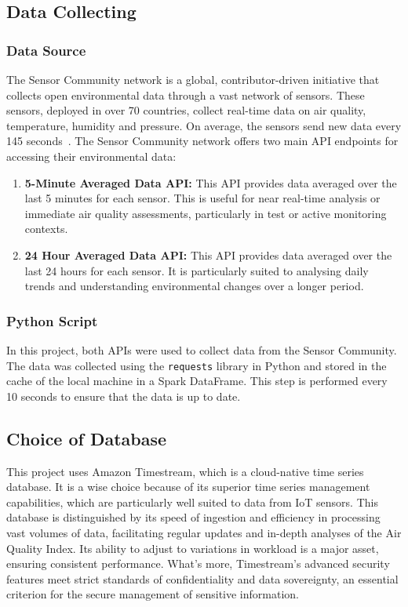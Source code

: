 \documentclass[12pt,oneside]{book} %
\begin{document}
\subsection{Data Collecting}
\subsubsection{Data Source}
The Sensor Community network is a global, contributor-driven initiative that
collects open environmental data through a vast network of sensors. These
sensors, deployed in over 70 countries, collect real-time data on air quality,
temperature, humidity and pressure. On average, the sensors send new data every
145 seconds~\cite{sensorcommunity2023synchronization}. The Sensor Community
network offers two main API endpoints for accessing their environmental data:

\begin{enumerate}
    \item \textbf{5-Minute Averaged Data API:} This API provides data averaged over the last 5 minutes for each sensor. This is useful for near real-time analysis or immediate air quality assessments, particularly in test or active monitoring contexts.
    \item \textbf{24 Hour Averaged Data API:} This API provides data averaged over the last 24 hours for each sensor. It is particularly suited to analysing daily trends and understanding environmental changes over a longer period.
\end{enumerate}

\subsubsection{Python Script}
In this project, both APIs were used to collect data from the Sensor Community.
The data was collected using the \texttt{requests} library in Python and stored
in the cache of the local machine in a Spark DataFrame. This step is performed
every 10 seconds to ensure that the data is up to date.

\subsection{Choice of Database}
This project uses Amazon Timestream, which is a cloud-native time series
database. It is a wise choice because of its superior time series management
capabilities, which are particularly well suited to data from IoT sensors. This
database is distinguished by its speed of ingestion and efficiency in
processing vast volumes of data, facilitating regular updates and in-depth
analyses of the Air Quality Index. Its ability to adjust to variations in
workload is a major asset, ensuring consistent performance. What's more,
Timestream's advanced security features meet strict standards of
confidentiality and data sovereignty, an essential criterion for the secure
management of sensitive information.
\end{document}
